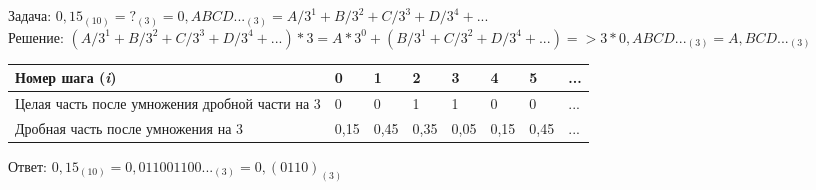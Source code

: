 \small{
Задача: $0,15_{(10)}=?_{(3)}=0,ABCD..._{(3)}=A/3^{1}+B/3^{2}+C/3^{3}+D/3^{4}+...$\\
Решение: $(A/3^{1}+B/3^{2}+C/3^{3}+D/3^{4}+...)*3=A*3^{0}+(B/3^{1}+C/3^{2}+D/3^{4}+...)=>3*0,ABCD..._{(3)}=A,BCD..._{(3)}$\\

\begin{tabular}{| m{5cm} | m{0.5cm} | m{0.5cm} | m{0.5cm} | m{0.5cm} | m{0.5cm} | m{0.5cm} | m{0.5cm} |}
    \hline
    Номер шага (\textit{i}) & 0 & 1 & 2 & 3 & 4 & 5 & ... \\
    \hline
    Целая часть после умножения дробной части на 3 & 0 & 0 & 1 & 1 & 0 & 0 & ...\\
    \hline
    Дробная часть после умножения на 3 & 0,15 & 0,45 & 0,35 & 0,05 & 0,15 & 0,45 & ...\\
    \hline
\end{tabular}
Ответ: $0,15_{(10)}= 0,011001100..._{(3)}=0,(0110)_{(3)}$
}


 
